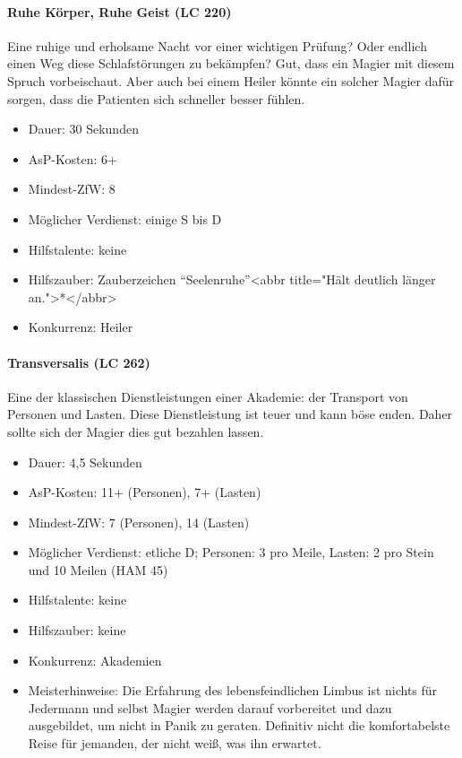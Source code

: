 \paragraph{Ruhe Körper, Ruhe Geist (LC 220)}
Eine ruhige und erholsame Nacht vor einer wichtigen Prüfung? Oder endlich einen Weg diese Schlafstörungen zu bekämpfen? Gut, dass ein Magier mit diesem Spruch vorbeischaut. Aber auch bei einem Heiler könnte ein solcher Magier dafür sorgen, dass die Patienten sich schneller besser fühlen.
\begin{itemize}
	\item Dauer: 30 Sekunden
	\item AsP-Kosten: 6+
	\item Mindest-ZfW: 8
	\item Möglicher Verdienst: einige S bis D
	\item Hilfstalente: keine
	\item Hilfszauber: Zauberzeichen \enquote{Seelenruhe}<abbr title="Hält deutlich länger an.">*</abbr>
	\item Konkurrenz: Heiler
\end{itemize}

\paragraph{Transversalis (LC 262)}
Eine der klassischen Dienstleistungen einer Akademie: der Transport von Personen und Lasten. Diese Dienstleistung ist teuer und kann böse enden. Daher sollte sich der Magier dies gut bezahlen lassen.
\begin{itemize}
	\item Dauer: 4,5 Sekunden
	\item AsP-Kosten: 11+ (Personen), 7+ (Lasten)
	\item Mindest-ZfW: 7 (Personen), 14 (Lasten)
	\item Möglicher Verdienst: etliche D; Personen: \SI{3}{\D} pro Meile, Lasten: \SI{2}{\D} pro Stein und 10 Meilen (HAM 45)
	\item Hilfstalente: keine
	\item Hilfszauber: keine
	\item Konkurrenz: Akademien
	\item Meisterhinweise: Die Erfahrung des lebensfeindlichen Limbus ist nichts für Jedermann und selbst Magier werden darauf vorbereitet und dazu ausgebildet, um nicht in Panik zu geraten. Definitiv nicht die komfortabelste Reise für jemanden, der nicht weiß, was ihn erwartet.
\end{itemize}

